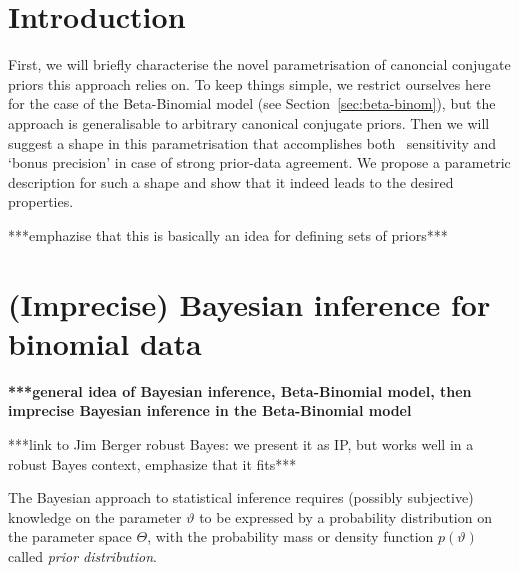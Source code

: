 
\def\El{\ul{\E}}
\def\Eu{\ol{\E}}

\def\Pl{\ul{\p}}
\def\Pu{\ol{\p}}

\newcommand{\ber}{\operatorname{Ber}}   %
\newcommand{\bin}{\operatorname{Binom}} %
\newcommand{\be}{\operatorname{Beta}}   %
\newcommand{\B}{\operatorname{B}}   %




\section{Introduction}

First, we will briefly characterise the novel parametrisation of canoncial conjugate priors this approach relies on.
To keep things simple, we restrict ourselves here for the case of the Beta-Binomial model (see Section~\ref{sec:beta-binom}),
but the approach is generalisable to arbitrary canonical conjugate priors.
Then we will suggest a shape in this parametrisation that accomplishes
both \pdc\ sensitivity and `bonus precision' in case of strong prior-data agreement.
We propose a parametric description for such a shape
and show that it indeed leads to the desired properties.

***emphazise that this is basically an idea for defining sets of priors***


\section{(Imprecise) Bayesian inference for binomial data}

\textbf{***general idea of Bayesian inference, Beta-Binomial model, then imprecise Bayesian inference in the Beta-Binomial model}

***link to Jim Berger robust Bayes: we present it as IP, but works well in a robust Bayes context, emphasize that it fits***

The Bayesian approach to statistical inference requires (possibly subjective) knowledge on the parameter $\vartheta$ to be expressed by a probability distribution on
the parameter space $\Theta$, with the probability mass or density function $p(\vartheta)$ called \emph{prior distribution}.



